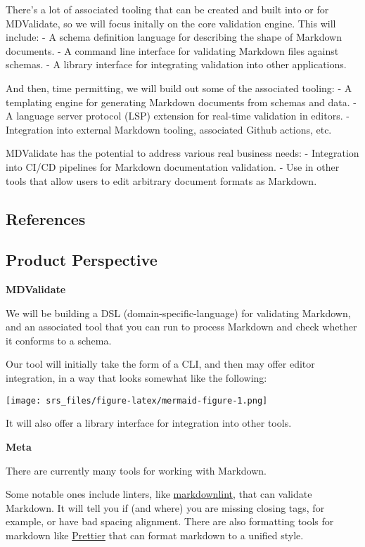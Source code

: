 \documentclass[
]{article}
\begin{document}
There's a lot of associated tooling that can be created and built into
or for MDValidate, so we will focus initally on the core validation
engine. This will include: - A schema definition language for describing
the shape of Markdown documents. - A command line interface for
validating Markdown files against schemas. - A library interface for
integrating validation into other applications.

And then, time permitting, we will build out some of the associated
tooling: - A templating engine for generating Markdown documents from
schemas and data. - A language server protocol (LSP) extension for
real-time validation in editors. - Integration into external Markdown
tooling, associated Github actions, etc.

MDValidate has the potential to address various real business needs: -
Integration into CI/CD pipelines for Markdown documentation validation.
- Use in other tools that allow users to edit arbitrary document formats
as Markdown.

\subsection{References}\label{references}

\subsection{Product Perspective}\label{product-perspective}

\textbf{MDValidate}

We will be building a DSL (domain-specific-language) for validating
Markdown, and an associated tool that you can run to process Markdown
and check whether it conforms to a schema.

Our tool will initially take the form of a CLI, and then may offer
editor integration, in a way that looks somewhat like the following:

\texttt{[image: srs\_files/figure-latex/mermaid-figure-1.png]}

It will also offer a library interface for integration into other tools.

\textbf{Meta}

There are currently many tools for working with Markdown.

Some notable ones include linters, like
\href{https://github.com/DavidAnson/markdownlint}{markdownlint}, that
can validate Markdown. It will tell you if (and where) you are missing
closing tags, for example, or have bad spacing alignment. There are also
formatting tools for markdown like \href{https://prettier.io/}{Prettier}
that can format markdown to a unified style.
\end{document}
